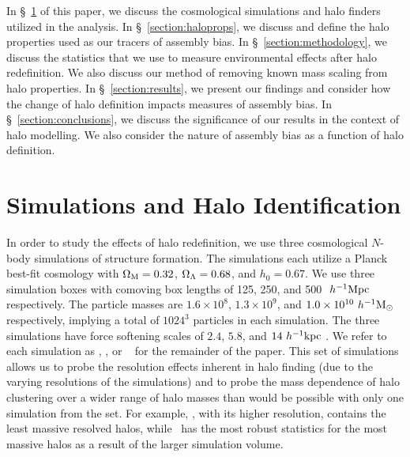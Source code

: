 \documentclass[usenatbib,fleqn]{mnras}
\begin{document}
 
In \S~\ref{section:data} of this paper, we discuss the cosmological simulations and halo finders
utilized in the analysis. In \S~\ref{section:haloprops}, we discuss 
and define the halo properties used as our tracers of assembly bias. In \S~\ref{section:methodology}, 
we discuss the statistics that we use to measure environmental effects after
halo redefinition. We also discuss our method of removing known mass scaling from halo properties.
In \S~\ref{section:results}, we present our findings and consider how the change
of halo definition impacts measures of assembly bias. In
\S~\ref{section:conclusions}, we discuss the significance of our results in the context of halo modelling.
 We also consider the nature of assembly bias as a function of halo definition.





\section[]{Simulations and Halo Identification}
\label{section:data}


In order to study the effects of halo redefinition, we use three cosmological $N$-body simulations of structure
formation. The \citet{diemer_kravtsov15} simulations each utilize a Planck best-fit cosmology with $\Omega_{\mathrm{M}} = 0.32$, $\Omega_{\Lambda} = 0.68$, and $h_0 = 0.67$. We use three simulation boxes with comoving box lengths of 125, 250, and 500
$\ h^{-1}\mathrm{Mpc}~$ respectively. The particle masses are $1.6 \times 10^8$, $1.3 \times 10^9$, and $1.0 \times 10^{10}
\ h^{-1}\mathrm{M}_{\odot}~$ respectively, implying a total of $1024^3$ particles in each simulation.  The three
simulations have force softening scales of $2.4$, $5.8$, and $14 \ h^{-1}\mathrm{kpc}~$. We refer to each simulation as
\simA, \simB, or \simC~  for the remainder of the paper. This set of simulations allows us to probe the
resolution effects inherent in halo finding (due to the varying resolutions of the simulations) and to probe the
mass dependence of halo clustering over a wider range of halo masses than would be possible with only one
simulation from the set. For example, \simA, with its higher resolution, contains the least massive resolved
halos, while \simC~has the most robust statistics for the most massive halos as a result of the larger simulation volume.
\end{document}

